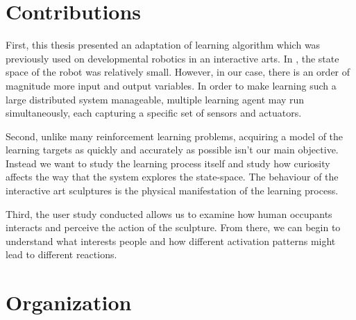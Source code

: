 \section{Contributions}

First, this thesis presented an adaptation of learning algorithm which was previously used on developmental robotics in an interactive arts. In \cite{Oudeyer2007}, the state space of the robot was relatively small. However, in our case, there is an order of magnitude more input and output variables. In order to make learning such a large distributed system manageable, multiple learning agent may run simultaneously, each capturing a specific set of sensors and actuators. 

Second, unlike many reinforcement learning problems, acquiring a model of the learning targets as quickly and accurately as possible isn't our main objective. Instead we want to study the learning process itself and study how curiosity affects the way that the system explores the state-space. The behaviour of the interactive art sculptures is the physical manifestation of the learning process. 

Third, the user study conducted allows us to examine how human occupants interacts and perceive the action of the sculpture. From there, we can begin to understand what interests people and how different activation patterns might lead to different reactions. 


\section{Organization}

